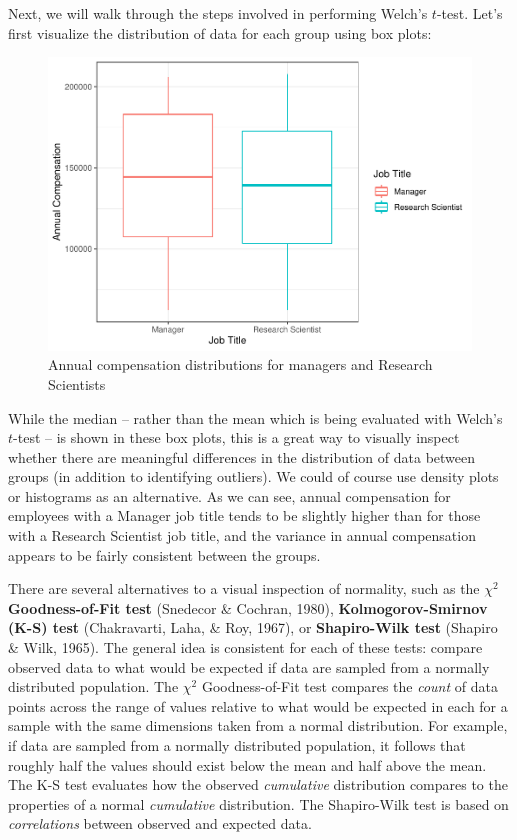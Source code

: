 \documentclass[
]{book}
\begin{document}
Next, we will walk through the steps involved in performing Welch's \(t\)-test. Let's first visualize the distribution of data for each group using box plots:

\begin{figure}

{\centering \includegraphics[width=1\linewidth]{The_Fundamentals_of_People_Analytics_files/figure-latex/comp-job-boxplots-1} 

}

\caption{Annual compensation distributions for managers and Research Scientists}\label{fig:comp-job-boxplots}
\end{figure}

While the median -- rather than the mean which is being evaluated with Welch's \(t\)-test -- is shown in these box plots, this is a great way to visually inspect whether there are meaningful differences in the distribution of data between groups (in addition to identifying outliers). We could of course use density plots or histograms as an alternative. As we can see, annual compensation for employees with a Manager job title tends to be slightly higher than for those with a Research Scientist job title, and the variance in annual compensation appears to be fairly consistent between the groups.

There are several alternatives to a visual inspection of normality, such as the \({\chi}^2\) \textbf{Goodness-of-Fit test} (Snedecor \& Cochran, 1980), \textbf{Kolmogorov-Smirnov (K-S) test} (Chakravarti, Laha, \& Roy, 1967), or \textbf{Shapiro-Wilk test} (Shapiro \& Wilk, 1965). The general idea is consistent for each of these tests: compare observed data to what would be expected if data are sampled from a normally distributed population. The \({\chi}^2\) Goodness-of-Fit test compares the \emph{count} of data points across the range of values relative to what would be expected in each for a sample with the same dimensions taken from a normal distribution. For example, if data are sampled from a normally distributed population, it follows that roughly half the values should exist below the mean and half above the mean. The K-S test evaluates how the observed \emph{cumulative} distribution compares to the properties of a normal \emph{cumulative} distribution. The Shapiro-Wilk test is based on \emph{correlations} between observed and expected data.
\end{document}
